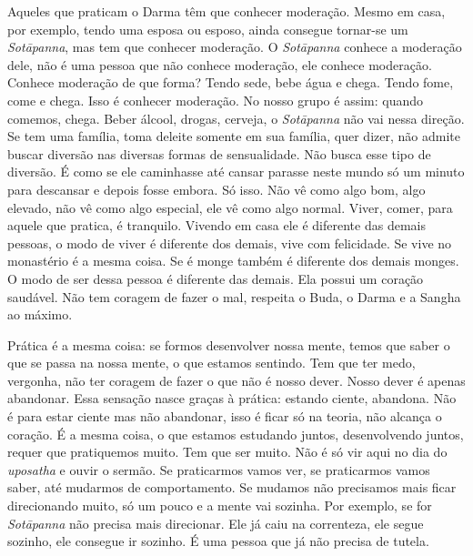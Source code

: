 Aqueles que praticam o Darma têm que conhecer moderação. Mesmo em
casa, por exemplo, tendo uma esposa ou esposo, ainda consegue tornar-se
um \textit{Sotāpanna}, mas tem que conhecer moderação. O
\textit{Sotāpanna} conhece a moderação dele, não é uma pessoa que não
conhece moderação, ele conhece moderação. Conhece moderação de que
forma? Tendo sede, bebe água e chega. Tendo fome, come e chega. Isso é
conhecer moderação. No nosso grupo é assim: quando comemos, chega.
Beber álcool, drogas, cerveja, o \textit{Sotāpanna} não vai nessa
direção. Se tem uma família, toma deleite somente em sua família, quer
dizer, não admite buscar diversão nas diversas formas de sensualidade.
Não busca esse tipo de diversão. É como se ele caminhasse até cansar
parasse neste mundo só um minuto para descansar e depois fosse embora.
Só isso. Não vê como algo bom, algo elevado, não vê como algo especial,
ele vê como algo normal. Viver, comer, para aquele que pratica, é
tranquilo. Vivendo em casa ele é diferente das demais pessoas, o modo
de viver é diferente dos demais, vive com felicidade. Se vive no
monastério é a mesma coisa. Se é monge também é diferente dos demais
monges. O modo de ser dessa pessoa é diferente das demais. Ela possui
um coração saudável. Não tem coragem de fazer o mal, respeita o Buda, o
Darma e a Sangha ao máximo. 

Prática é a mesma coisa: se formos desenvolver nossa mente, temos
que saber o que se passa na nossa mente, o que estamos sentindo. Tem
que ter medo, vergonha, não ter coragem de fazer o que não é nosso
dever. Nosso dever é apenas abandonar. Essa sensação nasce graças à
prática: estando ciente, abandona. Não é para estar ciente mas não
abandonar, isso é ficar só na teoria, não alcança o coração. É a mesma
coisa, o que estamos estudando juntos, desenvolvendo juntos, requer que
pratiquemos muito. Tem que ser muito. Não é só vir aqui no dia do
\textit{uposatha} e ouvir o sermão. Se praticarmos vamos ver, se
praticarmos vamos saber, até mudarmos de comportamento. Se mudamos não
precisamos mais ficar direcionando muito, só um pouco e a mente vai
sozinha. Por exemplo, se for \textit{Sotāpanna} não precisa mais
direcionar. Ele já caiu na correnteza, ele segue sozinho, ele consegue
ir sozinho. É uma pessoa que já não precisa de tutela. 

